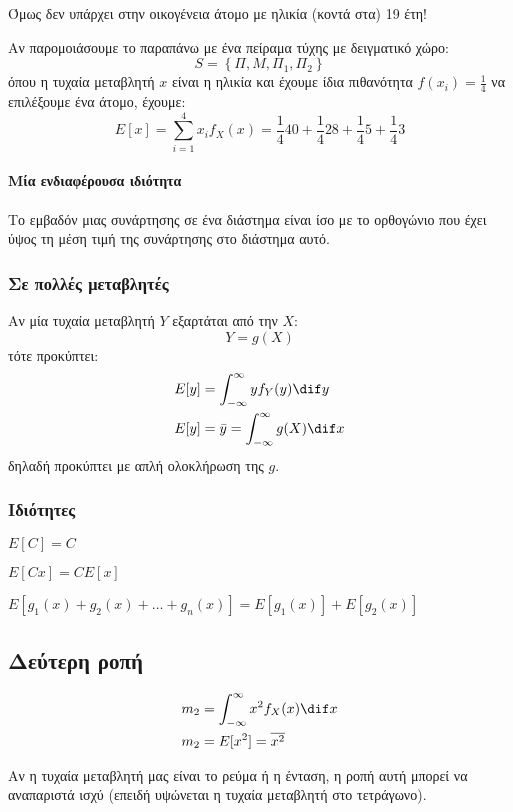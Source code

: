 \documentclass[11pt,a4paper,notitlepage,fleqn,final]{article}
\begin{document}
Όμως δεν υπάρχει στην οικογένεια άτομο με ηλικία (κοντά στα) 19 έτη!

Αν παρομοιάσουμε το παραπάνω με ένα πείραμα τύχης με δειγματικό
χώρο:
\[
S = \left\lbrace \varPi, M, \varPi_1, \varPi_2 \right\rbrace
\]
όπου η τυχαία μεταβλητή \( x \) είναι η ηλικία και έχουμε ίδια
πιθανότητα \( f(x_i) = \frac{1}{4} \) να επιλέξουμε ένα άτομο,
έχουμε:
\[
E[x] = \sum_{i=1}^{4} x_if_X(x) = \frac{1}{4}40 + \frac{1}{4}28 + \frac{1}{4}5 + \frac{1}{4}3
\]
\paragraph{Μία ενδιαφέρουσα ιδιότητα}
Το εμβαδόν μιας συνάρτησης σε ένα διάστημα είναι ίσο με το ορθογώνιο
που έχει ύψος τη μέση τιμή της συνάρτησης στο διάστημα αυτό.

\subsubsection{Σε πολλές μεταβλητές}
Αν μία τυχαία μεταβλητή \( Y \) εξαρτάται από την \( X \):
\[
Y = g(X)
\]
τότε προκύπτει:
\begin{align*}
E[y] &= \int_{-\infty}^{\infty} yf_Y(y)\dif y \\
E[y] &= \bar y = \int_{-\infty}^{\infty} g(X)\dif x
\end{align*}
δηλαδή προκύπτει με απλή ολοκλήρωση της \( g \).

\subsubsection{Ιδιότητες}
\begin{enumparen}
	\item \( E[C] = C \)
	\item \( E[Cx] = CE[x] \)
	\item \( E\left[g_1(x)+g_2(x)+\dots+g_n(x)\right] 
	= E\left[g_1(x)\right] + E\left[g_2(x)\right]
	\)
\end{enumparen}

\subsection{Δεύτερη ροπή}
\begin{align*}
	m_2 &= \int_{-\infty}^{\infty} x^2 f_X(x) \dif x\\
	m_2 &= E[x^2] = \overline{x^2}
\end{align*}

Αν η τυχαία μεταβλητή μας είναι το ρεύμα ή η ένταση, η ροπή αυτή
μπορεί να αναπαριστά ισχύ (επειδή υψώνεται η τυχαία μεταβλητή
στο τετράγωνο).
\end{document}

